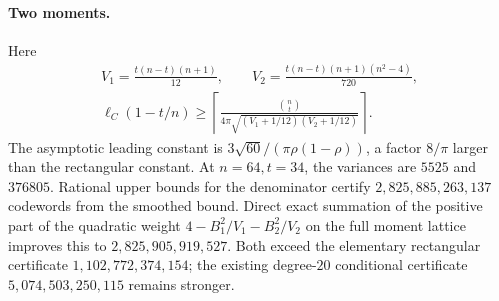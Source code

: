 \documentclass[11pt,letterpaper]{article}
\theoremstyle{definition}
\theoremstyle{remark}
\begin{document}
\paragraph{Two moments.}
Here
\[
 \begin{gathered}
 V_1=\frac{t(n-t)(n+1)}{12},\qquad
 V_2=\frac{t(n-t)(n+1)(n^2-4)}{720},\\
 \ell_C(1-t/n)\ge
 \left\lceil\frac{\binom nt}
 {4\pi\sqrt{(V_1+1/12)(V_2+1/12)}}\right\rceil.
 \end{gathered}
\]
The asymptotic leading constant is
$3\sqrt{60}/(\pi\rho(1-\rho))$, a factor $8/\pi$ larger than the
rectangular constant. At $n=64,t=34$, the variances are $5525$ and
$376805$. Rational upper bounds for the denominator certify
$2{,}825{,}885{,}263{,}137$ codewords from the smoothed bound.
Direct exact summation of the positive part of the quadratic weight
$4-B_1^2/V_1-B_2^2/V_2$ on the full moment lattice improves this to
$2{,}825{,}905{,}919{,}527$. Both exceed the elementary rectangular
certificate $1{,}102{,}772{,}374{,}154$; the existing degree-$20$
conditional certificate $5{,}074{,}503{,}250{,}115$ remains stronger.
\end{document}
